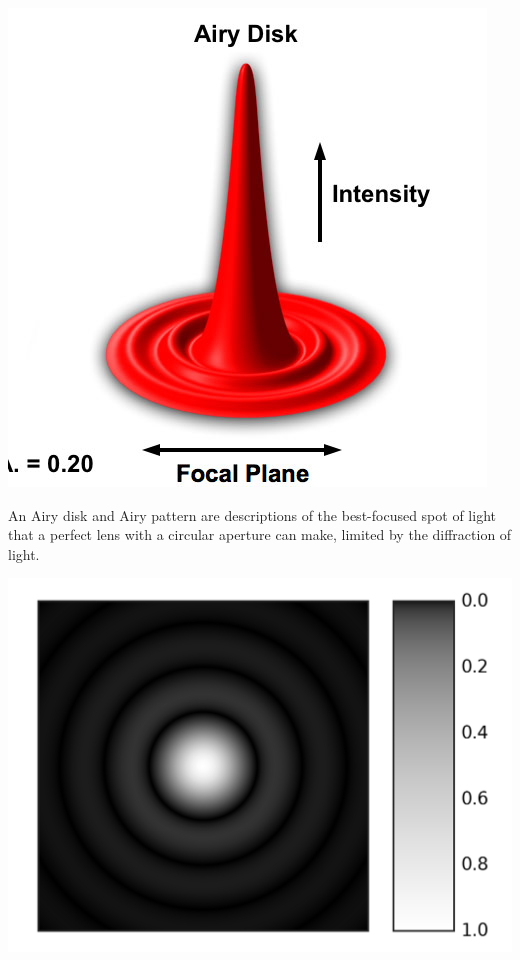 \documentclass[10pt]{article}
\begin{document}
\begin{center}
    \includegraphics*[scale = .5]{imgs/numerical-aperture.jpg}
\end{center}

An Airy disk and Airy pattern are descriptions of the best-focused spot of light that a perfect lens with a circular aperture can make, limited by the diffraction of light.

\begin{center}
    \includegraphics*[scale = .2]{imgs/Airy-pattern.png}
\end{center}
\end{document}
